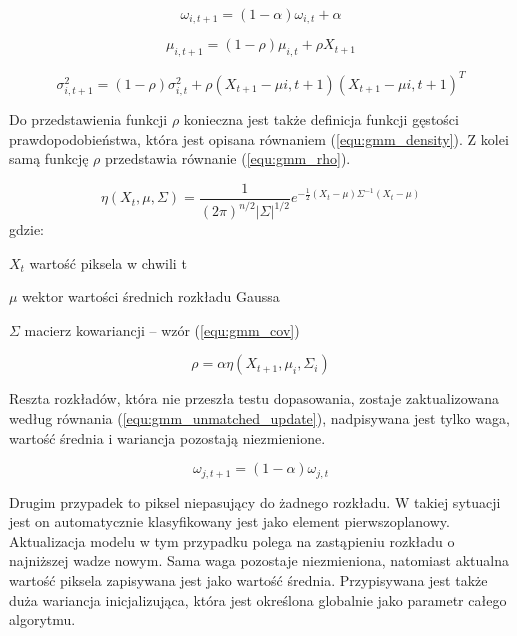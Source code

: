     \begin{equation}
        \omega_{i, t+1} = (1-\alpha)\omega_{i,t} + \alpha
    \label{equ:gmm_w_update}
    \end{equation}

    \begin{equation}
        \mu_{i, t+1} = (1-\rho)\mu_{i,t} + \rho X_{t+1}
    \label{equ:gmm_u_update}
    \end{equation}

    \begin{equation}
        \sigma_{i, t+1}^2 = (1-\rho)\sigma_{i,t}^2 + \rho (X_{t+1} - \mu{i,t+1})(X_{t+1} - \mu{i,t+1})^T
    \label{equ:gmm_sigma_update}
    \end{equation}

\noindent Do przedstawienia funkcji $\rho$ konieczna jest także definicja funkcji gęstości prawdopodobieństwa, która jest opisana równaniem (\ref{equ:gmm_density}). Z kolei samą funkcję $\rho$ przedstawia równanie (\ref{equ:gmm_rho}).

    \begin{equation}
        \eta (X_t, \mu, \Sigma) = \frac{1}{(2\pi)^{n/2} |\Sigma|^{1/2}} e^{-\frac{1}{2} (X_t - \mu)\Sigma^{-1} (X_t - \mu)} 
    \label{equ:gmm_density}
    \end{equation}
gdzie:
\begin{eqwhere}[2cm]
	\item[$X_t$] wartość piksela w chwili t
	\item[$\mu$] wektor wartości średnich rozkładu Gaussa
	\item[$\Sigma$] macierz kowariancji -- wzór (\ref{equ:gmm_cov})\\
\end{eqwhere}


    \begin{equation}
        \rho = \alpha \eta(X_{t+1}, \mu_{i}, \Sigma_{i})
    \label{equ:gmm_rho}
    \end{equation}

Reszta rozkładów, która nie przeszła testu dopasowania, zostaje zaktualizowana według równania (\ref{equ:gmm_unmatched_update}), nadpisywana jest tylko waga, wartość średnia i wariancja pozostają niezmienione.

    \begin{equation}
        \omega_{j,t+1} = (1-\alpha)\omega_{j,t}
    \label{equ:gmm_unmatched_update}
    \end{equation}

Drugim przypadek to piksel niepasujący do żadnego rozkładu. W takiej sytuacji jest on automatycznie klasyfikowany jest jako element pierwszoplanowy. Aktualizacja modelu w tym przypadku polega na zastąpieniu rozkładu o najniższej wadze nowym. Sama waga pozostaje niezmieniona, natomiast aktualna wartość piksela zapisywana jest jako wartość średnia. Przypisywana jest także duża wariancja inicjalizująca, która jest określona globalnie jako parametr całego algorytmu. \\

